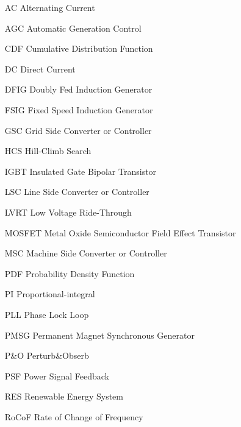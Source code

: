 \begin{glossary}{}

\begin{itemize}[leftmargin=4.5em,align=parleft,labelsep=1cm]
	
\item[AC] Alternating Current
\item[AGC] Automatic Generation Control
\item[CDF] Cumulative Distribution Function
\item[DC] Direct Current
\item[DFIG] Doubly Fed Induction Generator
\item[FSIG] Fixed Speed Induction Generator
\item[GSC] Grid Side Converter or Controller
\item[HCS] Hill-Climb Search
\item[IGBT] Insulated Gate Bipolar Transistor
\item[LSC] Line Side Converter or Controller
\item[LVRT] Low Voltage Ride-Through
\item[MOSFET] Metal Oxide Semiconductor Field Effect Transistor
\item[MSC] Machine Side Converter or Controller
\item[PDF] Probability Density Function
\item[PI] Proportional-integral
\item[PLL] Phase Lock Loop
\item[PMSG] Permanent Magnet Synchronous Generator
\item[P\&O] Perturb\&Obserb
\item[PSF] Power Signal Feedback
\item[RES] Renewable Energy System
\item[RoCoF] Rate of Change of Frequency

\end{itemize}

\end{glossary}
